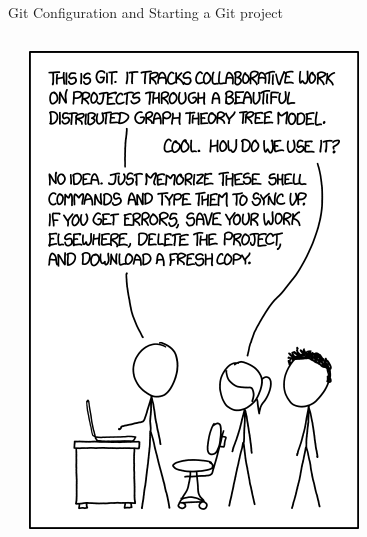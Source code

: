 \begin{frame}[t,fragile]{Git Configuration and Starting a Git project}
\begin{columns}
{\begin{itemize}
      \end{itemize}
    }
    \begin{center}
      \includegraphics[angle=0,width=\textwidth]{./Figs/git.png}%
    \end{center}
  \end{columns}
  
  
\end{frame}
